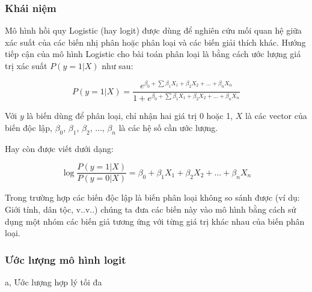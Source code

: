 \documentclass[a4paper]{report}\usepackage[]{graphicx}\usepackage[]{color}
\begin{document}
\subsubsection{Khái niệm}

Mô hình hồi quy Logistic (hay logit) được dùng để nghiên cứu mối quan hệ giữa xác suất của các biến nhị phân hoặc phân loại và các biến giải thích khác. Hướng tiếp cận của mô hình Logistic cho bài toán phân loại là bằng cách ước lượng giá trị xác suất $P(y = 1|X)$ như sau:

{\large
$$
P(y = 1|X) = \frac{e^{\beta_0 + \sum\beta_1X_1 +\beta_2X_2 + \ldots + \beta_nX_n}}{1 + e^{\beta_0 + \sum\beta_1X_1 +\beta_2X_2 + \ldots + \beta_nX_n}}
$$
}

Với $y$ là biến dùng để phân loại, chỉ nhận hai giá trị 0 hoặc 1, $X$ là các vector của biến độc lập, $\beta_0$, $\beta_1$, $\beta_2$, ..., $\beta_n$ là các hệ số cần ước lượng. 

Hay còn được viết dưới dạng:

{\large
$$
\log\frac{P(y = 1|X)}{P(y = 0|X)} = \beta_0 + \beta_1X_1 +\beta_2X_2 + \ldots + \beta_nX_n
$$
}

 
Trong trường hợp các biến độc lập là biến phân loại không so sánh được (ví dụ: Giới tính, dân tộc, v..v..) chúng ta đưa các biến này vào mô hình bằng cách sử dụng một nhóm các biến giả tương ứng với từng giá trị khác nhau của biến phân loại.

\subsubsection{Ước lượng mô hình logit}
a, Ước lượng hợp lý tối đa
\end{document}
